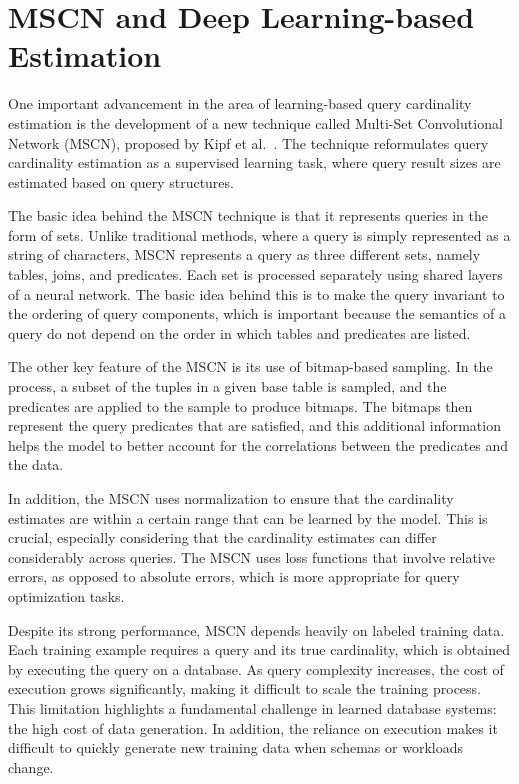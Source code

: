 \section{MSCN and Deep Learning-based Estimation}

One important advancement in the area of learning-based query cardinality estimation is the development of a new technique called Multi-Set Convolutional Network (MSCN), proposed by Kipf et al.~\cite{DBLP:conf/cidr/KipfKRLBK19}. The technique reformulates query cardinality estimation as a supervised learning task, where query result sizes are estimated based on query structures.

The basic idea behind the MSCN technique is that it represents queries in the form of sets. Unlike traditional methods, where a query is simply represented as a string of characters, MSCN represents a query as three different sets, namely tables, joins, and predicates. Each set is processed separately using shared layers of a neural network. The basic idea behind this is to make the query invariant to the ordering of query components, which is important because the semantics of a query do not depend on the order in which tables and predicates are listed.

The other key feature of the MSCN is its use of bitmap-based sampling. In the process, a subset of the tuples in a given base table is sampled, and the predicates are applied to the sample to produce bitmaps. The bitmaps then represent the query predicates that are satisfied, and this additional information helps the model to better account for the correlations between the predicates and the data.

In addition, the MSCN uses normalization to ensure that the cardinality estimates are within a certain range that can be learned by the model. This is crucial, especially considering that the cardinality estimates can differ considerably across queries. The MSCN uses loss functions that involve relative errors, as opposed to absolute errors, which is more appropriate for query optimization tasks.

Despite its strong performance, MSCN depends heavily on labeled training data. Each training example requires a query and its true cardinality, which is obtained by executing the query on a database. As query complexity increases, the cost of execution grows significantly, making it difficult to scale the training process. This limitation highlights a fundamental challenge in learned database systems: the high cost of data generation. In addition, the reliance on execution makes it difficult to quickly generate new training data when schemas or workloads change.

